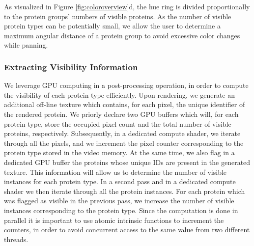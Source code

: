 \documentclass{egpubl}
\begin{document}
	As visualized in Figure \ref{fig:coloroverview}d, the hue ring is divided proportionally to the protein groups' numbers of visible proteins. 
	As the number of visible protein types can be potentially small, we allow the user to determine a maximum angular distance of a protein group to avoid excessive color changes while panning. 
	
	
	\subsubsection{Extracting Visibility Information}
	\label{sssec:extracting}
	We leverage GPU computing in a post-processing operation, in order to compute the visibility of each protein type efficiently.
	Upon rendering, we generate an additional off-line texture which contains, for each pixel, the unique identifier of the rendered protein.
	We priorly declare two GPU buffers which will, for each protein type, store the occupied pixel count and the total number of visible proteins, respectively.
	Subsequently, in a dedicated compute shader, we iterate through all the pixels, and we increment the pixel counter corresponding to the protein type stored in the video memory.
	At the same time, we also flag in a dedicated GPU buffer the proteins whose unique IDs are present in the generated texture.
	This information will allow us to determine the number of visible instances for each protein type.
	In a second pass and in a dedicated compute shader we then iterate through all the protein instances.
	For each protein which was flagged as visible in the previous pass, we increase the number of visible instances corresponding to the protein type.
	Since the computation is done in parallel it is important to use atomic intrinsic functions to increment the counters, in order to avoid concurrent access to the same value from two different threads.
	
\end{document}
